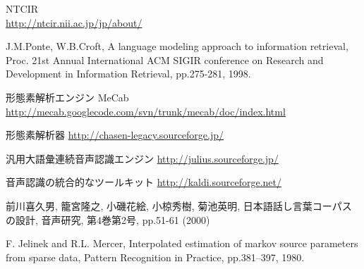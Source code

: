 \documentclass[a4paper,twocolumn,report,10.5pt]{jsbook}
\begin{document}





% 


	


\onecolumn %



\begin{thebibliography}{99} %

\renewcommand{\bibname}{参考文献}

NTCIR \\
\url{http://ntcir.nii.ac.jp/jp/about/}

J.M.Ponte, W.B.Croft, A language modeling approach to information retrieval, 
Proc. 21st Annual International ACM SIGIR conference on Research and Development in Information Retrieval, pp.275-281, 1998.

形態素解析エンジン MeCab
\url{http://mecab.googlecode.com/svn/trunk/mecab/doc/index.html}

形態素解析器
\url{http://chasen-legacy.sourceforge.jp/}

汎用大語彙連続音声認識エンジン
\url{http://julius.sourceforge.jp/}

音声認識の統合的なツールキット
\url{http://kaldi.sourceforge.net/}

前川喜久男, 籠宮隆之, 小磯花絵, 小椋秀樹, 菊池英明, 日本語話し言葉コーパスの設計, 音声研究, 第4巻第2号, pp.51-61 (2000)
                                                                                                                                                                                                                                                                                                                                                                                                                                                            


F. Jelinek and R.L. Mercer, Interpolated estimation of markov source parameters
from sparse data, Pattern Recognition in Practice, pp.381–397, 1980.



\end{thebibliography}
\end{document}
